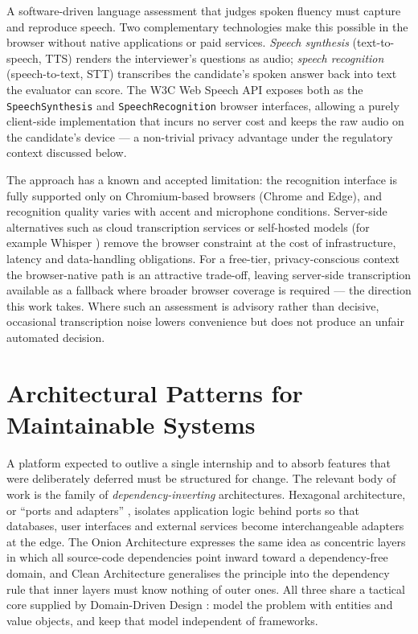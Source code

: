 A software-driven language assessment that judges spoken fluency must capture
and reproduce speech. Two complementary technologies make this possible in
the browser without native applications or paid services. \emph{Speech
synthesis} (text-to-speech, TTS) renders the interviewer's questions as
audio; \emph{speech recognition} (speech-to-text, STT) transcribes the
candidate's spoken answer back into text the evaluator can score. The W3C
Web Speech API \parencite{W3CWebSpeech2020} exposes both as the
\texttt{SpeechSynthesis} and \texttt{SpeechRecognition} browser interfaces,
allowing a purely client-side implementation that incurs no server cost and
keeps the raw audio on the candidate's device --- a non-trivial privacy
advantage under the regulatory context discussed below.

The approach has a known and accepted limitation: the recognition interface
is fully supported only on Chromium-based browsers (Chrome and Edge), and
recognition quality varies with accent and microphone conditions. Server-side
alternatives such as cloud transcription services or self-hosted models
(for example Whisper \parencite{Radford2022Whisper}) remove the browser constraint at the cost of
infrastructure, latency and data-handling obligations. For a free-tier,
privacy-conscious context the browser-native path is an attractive
trade-off, leaving server-side transcription available as a fallback where
broader browser coverage is required --- the direction this work takes.
Where such an assessment is advisory rather than decisive, occasional
transcription noise lowers convenience but does not produce an unfair
automated decision.


\section{Architectural Patterns for Maintainable Systems}
\label{sec:sota-architecture}

A platform expected to outlive a single internship and to absorb features
that were deliberately deferred must be structured for change. The relevant
body of work is the family of \emph{dependency-inverting} architectures.
Hexagonal architecture, or ``ports and adapters''
\parencite{CockburnHexagonal2005}, isolates application logic behind ports
so that databases, user interfaces and external services become
interchangeable adapters at the edge. The Onion Architecture
\parencite{PalermoOnion2008} expresses the same idea as concentric layers in
which all source-code dependencies point inward toward a dependency-free
domain, and Clean Architecture \parencite{Martin2017} generalises the
principle into the dependency rule that inner layers must know nothing of
outer ones. All three share a tactical core supplied by Domain-Driven Design
\parencite{Evans2003}: model the problem with entities and value objects, and
keep that model independent of frameworks.

